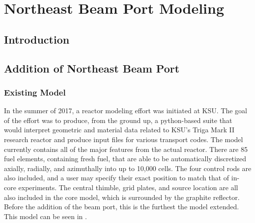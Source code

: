 
\cleardoublepage


\chapter{Northeast Beam Port Modeling}

\section{Introduction}


\section{Addition of Northeast Beam Port}


\subsection{Existing Model}

In the summer of 2017, a reactor modeling effort was initiated at KSU.
The goal of the effort was to produce, from the ground up, a python-based suite that would interpret geometric and material data related to KSU's Triga Mark II research reactor and produce input files for various transport codes.
The model currently contains all of the major features from the actual reactor.
There are 85 fuel elements, containing fresh fuel, that are able to be automatically discretized axially, radially, and azimuthally into up to 10,000 cells.
The four control rods are also included, and a user may specify their exact position to match that of in-core experiments.
The central thimble, grid plates, and source location are all also included in the core model, which is surrounded by the graphite reflector.
Before the addition of the beam port, this is the furthest the model extended.
This model can be seen in .


